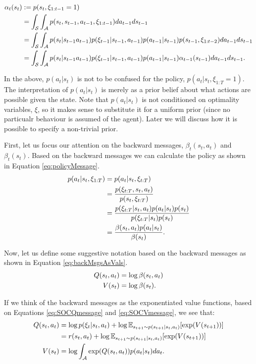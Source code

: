 \documentclass{report}
\numberwithin{equation}{section}
\numberwithin{figure}{section}
\numberwithin{table}{section}
\numberwithin{algorithm}{section}
\begin{document}
\begin{align}\label{eq:SOCforwardMessage}
  \alpha_t(s_t)&:=p(s_t, \xi_{1:t-1}=1)\notag\\
  &=\int_{\mathcal{S}}\int_{\mathcal{A}}p(s_t, s_{t-1},a_{t-1},\xi_{1:t-1})da_{t-1}ds_{t-1}\notag\\
  &=\int_{\mathcal{S}}\int_{\mathcal{A}}p(s_t|s_{t-1}a_{t-1})p(\xi_{t-1}|s_{t-1},a_{t-1})p(a_{t-1}|s_{t-1})p(s_{t-1}, \xi_{1:t-2})da_{t-1}ds_{t-1}\notag\\
  &=\int_{\mathcal{S}}\int_{\mathcal{A}}p(s_t|s_{t-1}a_{t-1})p(\xi_{t-1}|s_{t-1},a_{t-1})p(a_{t-1}|s_{t-1})\alpha_{t-1}(s_{t-1})da_{t-1}ds_{t-1}.
\end{align}

In the above, $p(a_t|s_t)$ is not to be confused for the policy, 
$p(a_t|s_t, \xi_{1:T}=1)$. The interpretation of $p(a_t|s_t)$ 
is merely as a prior belief about what actions are 
possible given the state. 
Note that $p(a_t|s_t)$ is not conditioned on optimality variables, 
$\xi$, so it makes sense to substitute it for a uniform prior 
(since no particualr behaviour is assumed of the agent). Later 
we will discuss how it is possible to specify a non-trivial prior.


First, let us focus our attention on the backward messages, 
$\beta_t(s_t, a_t)$ and $\beta_t(s_t)$. 
Based on the backward messages we can calculate the policy as 
shown in Equation \ref{eq:policyMessage}.
\begin{align}\label{eq:policyMessage}
  p(a_t|s_t,\xi_{1:T})&=p(a_t|s_t,\xi_{t:T})\notag\\
  &=\frac{p(\xi_{t:T},s_t,a_t)}{p(s_t,\xi_{t:T})}\notag\\
  &=\frac{p(\xi_{t:T}|s_t, a_t)p(a_t|s_t)p(s_t)}{p(\xi_{t:T}|s_t)p(s_t)}\notag\\
  &=\frac{\beta(s_t, a_t)p(a_t|s_t)}{\beta(s_t)}.
\end{align}

Now, let us define some 
suggestive notation based on the backward messages as shown 
in Equation \ref{eq:backMsgsAsVals}.
\begin{align}\label{eq:backMsgsAsVals}
  Q(s_t, a_t)&=\log \beta(s_t, a_t)\notag\\
  V(s_t)&=\log \beta(s_t).
\end{align}

If we think of the backward messages as the exponentiated 
value functions, based on Equations \ref{eq:SOCQmessage} and 
\ref{eq:SOCVmessage}, we see that:
\begin{align}\label{eq:badVals}
  Q(s_t, a_t)&=\log p(\xi_t|s_t, a_t) + \log\mathbb{E}_{s_{t+1}\sim p(s_{t+1}|s_t, a_t)}[\exp (V(s_{t+1}))]\notag\\
  &=r(s_t, a_t) + \log\mathbb{E}_{s_{t+1}\sim p(s_{t+1}|s_t, a_t)}[\exp (V(s_{t+1}))]\notag\\
  V(s_t)&=\log \int_{\mathcal{A}}\exp (Q(s_t, a_t))p(a_t|s_t)da_t.
\end{align}
\end{document}
